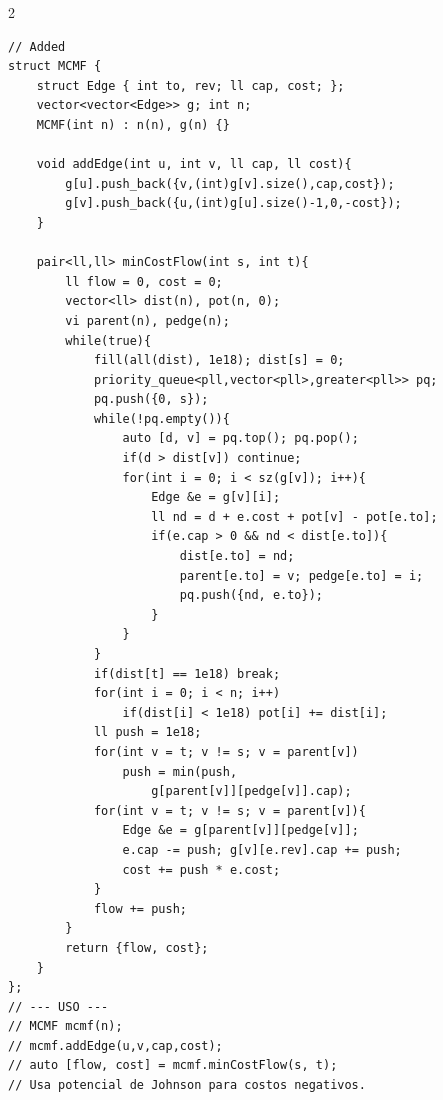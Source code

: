 \documentclass[10pt,a4paper]{article}
\begin{document}
\begin{multicols}{2}
\begin{lstlisting}
// Added
struct MCMF {
    struct Edge { int to, rev; ll cap, cost; };
    vector<vector<Edge>> g; int n;
    MCMF(int n) : n(n), g(n) {}

    void addEdge(int u, int v, ll cap, ll cost){
        g[u].push_back({v,(int)g[v].size(),cap,cost});
        g[v].push_back({u,(int)g[u].size()-1,0,-cost});
    }

    pair<ll,ll> minCostFlow(int s, int t){
        ll flow = 0, cost = 0;
        vector<ll> dist(n), pot(n, 0);
        vi parent(n), pedge(n);
        while(true){
            fill(all(dist), 1e18); dist[s] = 0;
            priority_queue<pll,vector<pll>,greater<pll>> pq;
            pq.push({0, s});
            while(!pq.empty()){
                auto [d, v] = pq.top(); pq.pop();
                if(d > dist[v]) continue;
                for(int i = 0; i < sz(g[v]); i++){
                    Edge &e = g[v][i];
                    ll nd = d + e.cost + pot[v] - pot[e.to];
                    if(e.cap > 0 && nd < dist[e.to]){
                        dist[e.to] = nd;
                        parent[e.to] = v; pedge[e.to] = i;
                        pq.push({nd, e.to});
                    }
                }
            }
            if(dist[t] == 1e18) break;
            for(int i = 0; i < n; i++)
                if(dist[i] < 1e18) pot[i] += dist[i];
            ll push = 1e18;
            for(int v = t; v != s; v = parent[v])
                push = min(push,
                    g[parent[v]][pedge[v]].cap);
            for(int v = t; v != s; v = parent[v]){
                Edge &e = g[parent[v]][pedge[v]];
                e.cap -= push; g[v][e.rev].cap += push;
                cost += push * e.cost;
            }
            flow += push;
        }
        return {flow, cost};
    }
};
// --- USO ---
// MCMF mcmf(n);
// mcmf.addEdge(u,v,cap,cost);
// auto [flow, cost] = mcmf.minCostFlow(s, t);
// Usa potencial de Johnson para costos negativos.
\end{lstlisting}

\end{multicols}
\newpage
\end{document}
